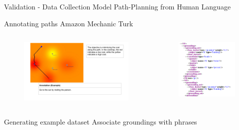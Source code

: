 \begin{frame}{Validation - Data Collection}{ Model Path-Planning from Human Language }

\begin{block}{Annotating paths}
Amazon Mechanic Turk
\end{block}

\begin{columns}	
	\begin{figure}
		\centering
		\includegraphics[width=.9\linewidth]{figure/annotation_task}
	\end{figure}
	\begin{figure}
		\centering
		\includegraphics[width=\linewidth]{figure/example_xml}
	\end{figure}
\end{columns}
\begin{block}{Generating example dataset}
Associate groundings with phrases
\end{block}

\end{frame}

